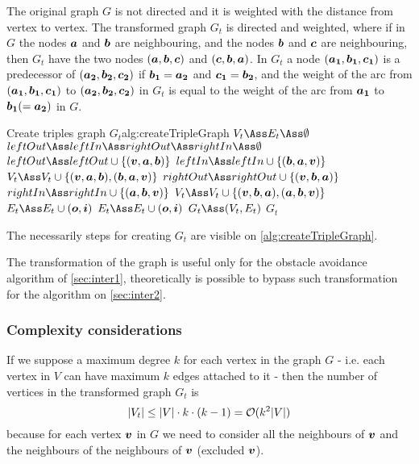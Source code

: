 \documentclass[dissertation.tex]{subfiles}
\begin{document}
The original graph $G$ is not directed and it is weighted
with the distance from vertex to vertex. The transformed graph $G_t$ is
directed and weighted, where if in $G$ the nodes $\boldsymbol{a}$
and $\boldsymbol{b}$ are
neighbouring, and the nodes $\boldsymbol{b}$ and $\boldsymbol{c}$ are neighbouring, then $G_t$
have the two nodes $(\boldsymbol{a},\boldsymbol{b},\boldsymbol{c})$ and $(\boldsymbol{c},\boldsymbol{b},\boldsymbol{a})$. In
$G_t$ a node $(\boldsymbol{a_1},\boldsymbol{b_1},\boldsymbol{c_1})$ is a predecessor of
$(\boldsymbol{a_2},\boldsymbol{b_2},\boldsymbol{c_2})$ if $\boldsymbol{b_1}=\boldsymbol{a_2}$ and $\boldsymbol{c_1}=\boldsymbol{b_2}$, and the weight of the arc
from $(\boldsymbol{a_1},\boldsymbol{b_1},\boldsymbol{c_1})$ to $(\boldsymbol{a_2},\boldsymbol{b_2},\boldsymbol{c_2})$ in $G_t$ is
equal to
the weight of the arc from $\boldsymbol{a_1}$ to $\boldsymbol{b_1}(=\boldsymbol{a_2})$ in $G$.

\begin{algo}{Create triples graph $G_t$}{alg:createTripleGraph}
  \State $V_t\Ass E_t\Ass \emptyset$
  \label{ln:tripleFor0}
  \State $leftOut\Ass leftIn\Ass rightOut\Ass rightIn\Ass \emptyset$
  \State $leftOut \Ass leftOut\cup \{(\ve{v},\ve{a},\ve{b})\}$
  \State $leftIn \Ass leftIn\cup \{(\ve{b},\ve{a},\ve{v})\}$
  \State $V_t \Ass V_t\cup \{(\ve{v},\ve{a},\ve{b}), (\ve{b},\ve{a},\ve{v})\}$
  \EndFor
  \State $rightOut \Ass rightOut\cup \{(\ve{v},\ve{b},\ve{a})\}$
  \State $rightIn \Ass rightIn\cup \{(\ve{a},\ve{b},\ve{v})\}$
  \State $V_t \Ass V_t\cup \{(\ve{v},\ve{b},\ve{a}), (\ve{a},\ve{b},\ve{v})\}$
  \EndFor
  \State $E_t \Ass E_t\cup (\ve{o},\ve{i})$
  \EndFor
  \EndFor
  \label{ln:tripleFor1}
  \label{ln:tripleFor2}
  \State $E_t \Ass E_t\cup (\ve{o},\ve{i})$
  \EndFor
  \EndFor
  \EndFor
  \State $G_t\Ass(V_t,E_t)$
  \State\Return $G_t$
  \EndFunction
\end{algo}
The necessarily steps for creating $G_t$ are visible on
\cref{alg:createTripleGraph}.

The transformation of the graph is useful only for the obstacle
avoidance algorithm of
\cref{sec:inter1}, theoretically is possible to bypass such
transformation for the algorithm on \cref{sec:inter2}.

\subsubsection{Complexity considerations}
If we suppose a maximum degree $k$ for each vertex in the graph $G$ -
i.e. each vertex in $V$ can have maximum $k$ edges attached to
it - then the number of vertices in the transformed graph $G_t$ is 
\begin{equation}
  \label{eq:numTriples}
  |V_t|\leq |V|\cdot k\cdot(k-1)=\mathcal{O}(k^2|V|)
\end{equation}
because for each vertex $\boldsymbol{v}$ in $G$ we need to
consider all the neighbours of $\boldsymbol{v}$ and the neighbours of the neighbours
of $\boldsymbol{v}$ (excluded $\boldsymbol{v}$).
\end{document}
